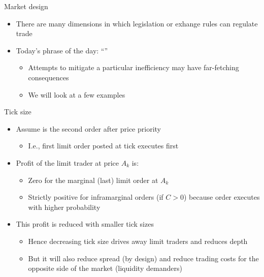\documentclass[english,10pt
,aspectratio=169
]{beamer}
\begin{document}
\begin{frame}{Market design}
	\begin{itemize}
		\item There are many dimensions in which legislation or exhange rules can regulate trade
		\item Today's phrase of the day: ``''
		\begin{itemize}
			\item Attempts to mitigate a particular inefficiency may have far-fetching consequences
			\item We will look at a few examples
		\end{itemize}
	\end{itemize}
\end{frame}


\begin{frame}{Tick size}
	\begin{itemize}
		\item Assume  is the second order after price priority
		\begin{itemize}
			\item I.e., first limit order posted at tick executes first
		\end{itemize}
		\item Profit of the limit trader at price $A_k$ is:
		\begin{itemize}
			\item Zero for the marginal (last) limit order at $A_k$
			\item Strictly positive for inframarginal orders (if $C>0$) because order executes with higher probability
		\end{itemize}
		\item This profit is reduced with \alert{smaller tick sizes}
		\begin{itemize}
			\item Hence decreasing tick size drives away limit traders and reduces depth
			\item But it will also reduce spread (by design) and reduce trading costs for the opposite side of the market (liquidity demanders)
		\end{itemize}
	\end{itemize}
\end{frame}
\end{document}
